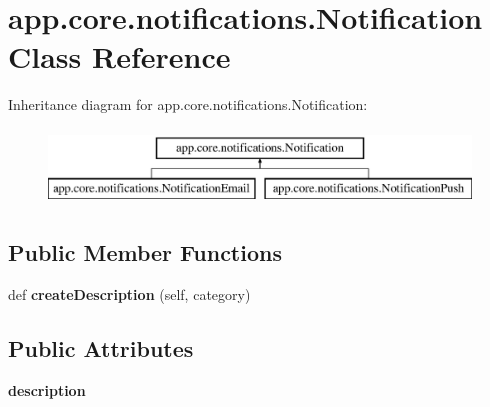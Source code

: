\hypertarget{classapp_1_1core_1_1notifications_1_1_notification}{}\section{app.\+core.\+notifications.\+Notification Class Reference}
\label{classapp_1_1core_1_1notifications_1_1_notification}
Inheritance diagram for app.\+core.\+notifications.\+Notification\+:\begin{figure}[H]
\begin{center}
\leavevmode
\includegraphics[height=2.000000cm]{classapp_1_1core_1_1notifications_1_1_notification}
\end{center}
\end{figure}
\subsection*{Public Member Functions}
\begin{DoxyCompactItemize}
\item 
\mbox{\label{classapp_1_1core_1_1notifications_1_1_notification_afa4a0e24ccafc398075196ca8f39a37c}} 
def {\bfseries create\+Description} (self, category)
\end{DoxyCompactItemize}
\subsection*{Public Attributes}
\begin{DoxyCompactItemize}
\item 
\mbox{\label{classapp_1_1core_1_1notifications_1_1_notification_a654a518dd6aa9fab2c2c24f2683cbc22}} 
{\bfseries description}
\end{DoxyCompactItemize}
